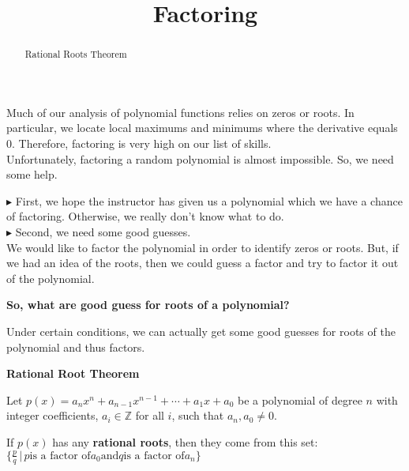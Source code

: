 \documentclass{ximera}
\title{Factoring}
\begin{document}
\begin{abstract}
Rational Roots Theorem
\end{abstract}
\maketitle




Much of our analysis of polynomial functions relies on zeros or roots. In particular, we locate local maximums and minimums where the derivative equals $0$.  Therefore, factoring is very high on our list of skills. \\

Unfortunately, factoring a random polynomial is almost impossible.  So, we need some help.


$\blacktriangleright$ First, we hope the instructor has given us a polynomial which we have a chance of factoring.  Otherwise, we really don't know what to do. \\




$\blacktriangleright$ Second, we need some good guesses. \\


We would like to factor the polynomial in order to identify zeros or roots.  But, if we had an idea of the roots, then we could guess a factor and try to factor it out of the polynomial. \\

\begin{center}
\textbf{\textcolor{red!80!black}{So, what are good guess for roots of a polynomial?}}
\end{center}


Under certain conditions, we can actually get some good guesses for roots of the polynomial and thus factors.






\begin{theorem} \textbf{\textcolor{green!50!black}{Rational Root Theorem}} 



Let $p(x) = a_n x^n + a_{n-1} x^{n-1} + \cdots + a_1 x + a_0$ be a polynomial of degree $n$ with integer coefficients, $a_i \in \mathbb{Z}$ for all $i$, such that $a_n, a_0 \ne 0$.

If $p(x)$ has any \textbf{rational roots}, then they come from this set: 
$\{ \frac{p}{q} \, | \, p \text{is a factor of} a_0 \text{and} q \text{is a factor of} a_n  \}$



\end{theorem}
\end{document}
